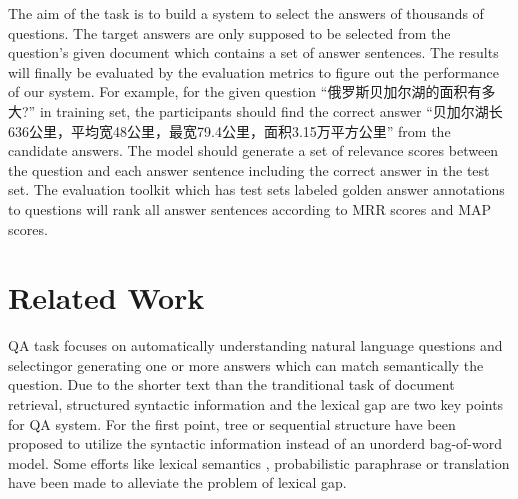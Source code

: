 \documentclass{llncs}
\begin{document}
The aim of the task is to build a system to select the answers of thousands of questions. The target answers are only supposed to be selected from the question's given document which contains a set of answer sentences. 
The results will finally be evaluated by the evaluation metrics to figure out the performance of our system. 
For example, for the given question ``俄罗斯贝加尔湖的面积有多大?'' in training set, the participants should find the correct answer ``贝加尔湖长636公里，平均宽48公里，最宽79.4公里，面积3.15万平方公里'' from the candidate answers. The model should generate a set of relevance scores between the question and each answer sentence including the correct answer in the test set. The evaluation toolkit which has test sets labeled golden answer annotations to questions will rank all answer sentences according to MRR scores and MAP scores. 



\section{Related Work}
\label{sec:relatedword}
QA task focuses on automatically understanding natural language questions and selectingor generating one or more answers which can match semantically the question. %
Due to the shorter text than the tranditional task of document retrieval, structured  syntactic information and  the lexical gap are two key points for QA system. 
For the first point, tree \cite{Yao2013Answer} or sequential \cite{Wang2015FAQ} structure have been proposed to utilize the syntactic information instead of an  unorderd bag-of-word model.
Some efforts like lexical semantics \cite{Yih2013Question}, probabilistic paraphrase or translation \cite{Zhou2011Phrase} have been made to alleviate the problem of lexical gap.
\end{document}
